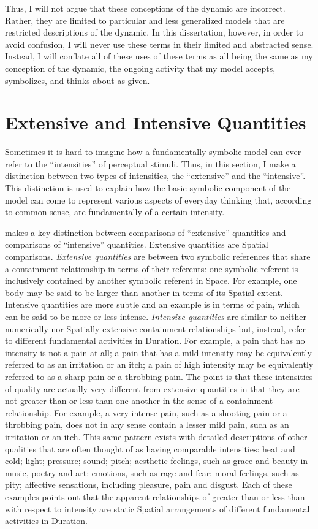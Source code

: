 Thus, I will not argue that these conceptions of the dynamic are
incorrect.  Rather, they are limited to particular and less
generalized models that are restricted descriptions of the dynamic.
In this dissertation, however, in order to avoid confusion, I will
never use these terms in their limited and abstracted sense.  Instead,
I will conflate all of these uses of these terms as all being the same
as my conception of the dynamic, the ongoing activity that my model
accepts, symbolizes, and thinks about as given.

\section{Extensive and Intensive Quantities}
\label{section:extensive_and_intensive_quantities}

Sometimes it is hard to imagine how a fundamentally symbolic model can
ever refer to the ``intensities'' of perceptual stimuli.  Thus, in
this section, I make a distinction between two types of intensities,
the ``extensive'' and the ``intensive''.  This distinction is used to
explain how the basic symbolic component of the model can come to
represent various aspects of everyday thinking that, according to
common sense, are fundamentally of a certain intensity.

\cite{bergson:1910} makes a key distinction between comparisons of
``extensive'' quantities and comparisons of ``intensive'' quantities.
Extensive quantities are Spatial comparisons.  \emph{Extensive
  quantities} are between two symbolic references that share a
containment relationship in terms of their referents: one symbolic
referent is inclusively contained by another symbolic referent in
Space.  For example, one body may be said to be larger than another in
terms of its Spatial extent.  Intensive quantities are more subtle and
an example is in terms of pain, which can be said to be more or less
intense.  \emph{Intensive quantities} are similar to neither
numerically nor Spatially extensive containment relationships but,
instead, refer to different fundamental activities in Duration.  For
example, a pain that has no intensity is not a pain at all; a pain
that has a mild intensity may be equivalently referred to as an
irritation or an itch; a pain of high intensity may be equivalently
referred to as a sharp pain or a throbbing pain.  The point is that
these intensities of quality are actually very different from
extensive quantities in that they are not greater than or less than
one another in the sense of a containment relationship.  For example,
a very intense pain, such as a shooting pain or a throbbing pain, does
not in any sense contain a lesser mild pain, such as an irritation or
an itch.  This same pattern exists with detailed descriptions of other
qualities that are often thought of as having comparable intensities:
heat and cold; light; pressure; sound; pitch; aesthetic feelings, such
as grace and beauty in music, poetry and art; emotions, such as rage
and fear; moral feelings, such as pity; affective sensations,
including pleasure, pain and disgust.  Each of these examples points
out that the apparent relationships of greater than or less than with
respect to intensity are static Spatial arrangements of different
fundamental activities in Duration.

